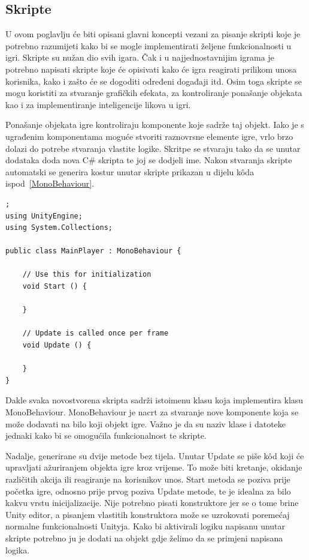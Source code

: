 \subsection{Skripte}
U ovom poglavlju će biti opisani glavni koncepti vezani za pisanje skripti koje je potrebno razumijeti kako bi se mogle implementirati željene funkcionalnosti u igri.
Skripte su nužan dio svih igara. Čak i u najjednostavnijim igrama je potrebno napisati skripte koje će opisivati kako će igra reagirati prilikom unosa korisnika, kako i zašto će se dogoditi određeni događaji itd. Osim toga skripte se mogu koristiti za stvaranje grafičkih efekata, za kontroliranje ponašanje objekata kao i za implementiranje inteligencije likova u igri.

Ponašanje objekata igre kontroliraju komponente koje sadrže taj objekt. Iako je s ugrađenim komponentama moguće stvoriti raznovrsne elemente igre, vrlo brzo dolazi do potrebe stvaranja vlastite logike. Skritpe se stvaraju tako da se unutar dodataka doda nova C\# skripta te joj se dodjeli ime. Nakon stvaranja skripte automatski se generira kostur unutar skripte prikazan u dijelu k\^oda ispod~\ref{MonoBehaviour}.
\begin{lstlisting}[caption={Nova skripta}, label=MonoBehaviour];
using UnityEngine;
using System.Collections;

public class MainPlayer : MonoBehaviour {

    // Use this for initialization
    void Start () {
    
    }
    
    // Update is called once per frame
    void Update () {
    
    }
}
\end{lstlisting}
Dakle svaka novostvorena skripta sadrži istoimenu klasu koja implementira klasu MonoBehaviour. MonoBehaviour je nacrt za stvaranje nove komponente koja se može dodavati na bilo koji objekt igre. Važno je da su naziv klase i datoteke jednaki kako bi se omogućila funkcionalnost te skripte.

Nadalje, generirane su dvije metode bez tijela. Unutar Update se piše k\^od koji će upravljati ažuriranjem objekta igre kroz vrijeme. To može biti kretanje, okidanje različitih akcija ili reagiranje na korisnikov unos. Start metoda se poziva prije početka igre, odnosno prije prvog poziva Update metode, te je idealna za bilo kakvu vrstu inicijalizacije. Nije potrebno pisati konstruktore jer se o tome brine Unity editor, a pisanjem vlastitih konstruktora može se uzrokovati poremećaj normalne funkcionalnosti Unityja. Kako bi aktivirali logiku napisanu unutar skripte potrebno ju je dodati na objekt gdje želimo da se primjeni napisana logika.

